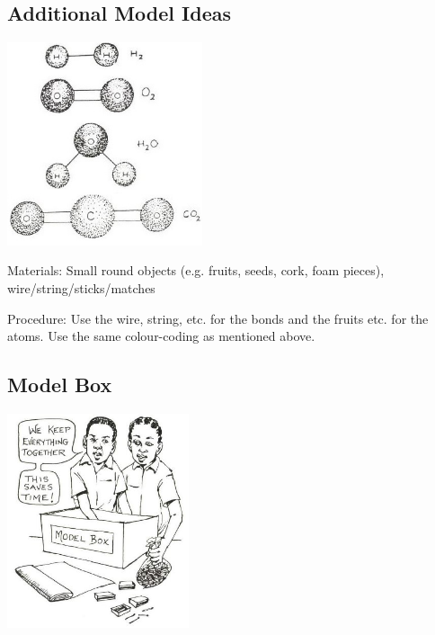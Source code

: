 \begin{multicols}{2}
\vfill
\columnbreak

\subsection{Additional Model Ideas}

\begin{center}
\includegraphics[width=0.43\textwidth]{./img/source/3d-models.jpg}
\end{center}

\begin{description*}
\item[Materials:]{Small round objects (e.g. fruits, seeds, cork, foam pieces), wire/string/sticks/matches}
\item[Procedure:]{Use the wire, string, etc. for the bonds and the fruits etc. for the atoms. Use the same colour-coding as mentioned above.}
\end{description*}

\vfill
\columnbreak

\subsection{Model Box}

\begin{center}
\includegraphics[width=0.4\textwidth]{./img/source/model-box.jpg}
\end{center}


\end{multicols}
